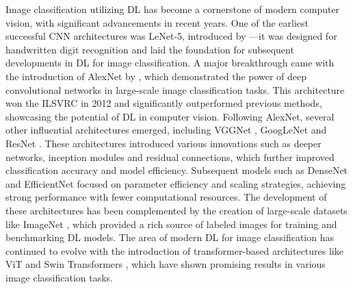 Image classification utilizing \ac{DL} has become a cornerstone of modern computer vision, with significant advancements in recent years.
One of the earliest successful \ac{CNN} architectures was LeNet-5, introduced by \textcite{lecunGradientbasedLearningApplied1998}---it was designed for handwritten digit recognition and laid the foundation for subsequent developments in \ac{DL} for image classification.
A major breakthrough came with the introduction of AlexNet by \textcite{krizhevskyImageNetClassificationDeep2012}, which demonstrated the power of deep convolutional networks in large-scale image classification tasks.
This architecture won the \ac{ILSVRC} in 2012 and significantly outperformed previous methods, showcasing the potential of \ac{DL} in computer vision.
Following AlexNet, several other influential architectures emerged, including VGGNet \autocite{simonyanVeryDeepConvolutional2015}, GoogLeNet \autocite{szegedyGoingDeeperConvolutions2015} and ResNet \autocite{heDeepResidualLearning2016}.
These architectures introduced various innovations such as deeper networks, inception modules and residual connections, which further improved classification accuracy and model efficiency.
Subsequent models such as DenseNet \autocite{huangDenselyConnectedConvolutional2017} and EfficientNet \autocite{tanEfficientNetRethinkingModel2019} focused on parameter efficiency and scaling strategies, achieving strong performance with fewer computational resources.
The development of these architectures has been complemented by the creation of large-scale datasets like ImageNet \autocite{dengImageNetLargescaleHierarchical2009}, which provided a rich source of labeled images for training and benchmarking \ac{DL} models.
The area of modern \ac{DL} for image classification has continued to evolve with the introduction of transformer-based architectures like \ac{ViT} \autocite{dosovitskiyImageWorth16x162021} and Swin Transformers \autocite{liuSwinTransformerHierarchical2021}, which have shown promising results in various image classification tasks.


